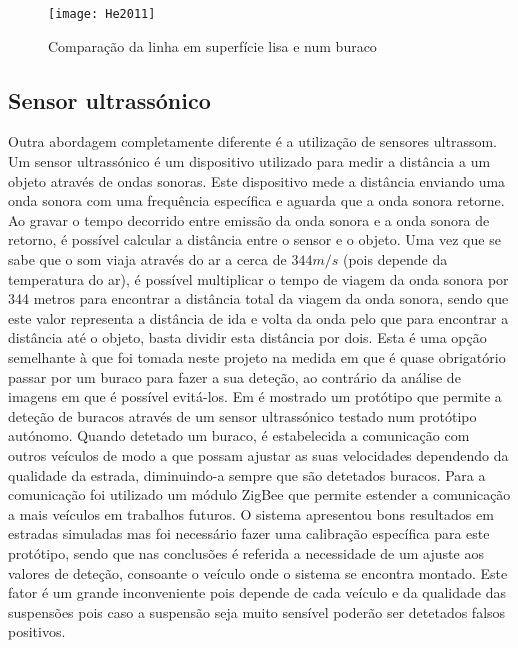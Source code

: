 \begin{figure}[htbp]
	\centering
	\texttt{[image: He2011]}
	\caption[Comparação da linha em superfície lisa e num buraco]{Comparação da linha em superfície lisa e num buraco \footnotemark}
	\label{fig:sensor_kinect}
\end{figure}
\vspace{5cm}

\subsection{Sensor ultrassónico}
\label{subsec:sensor_ultrassonico}
Outra abordagem completamente diferente é a utilização de sensores ultrassom.
Um sensor ultrassónico é um dispositivo utilizado para medir a distância a um objeto através de ondas sonoras.
Este dispositivo mede a distância enviando uma onda sonora com uma frequência específica e aguarda que a onda sonora retorne.
Ao gravar o tempo decorrido entre emissão da onda sonora e a onda sonora de retorno, é possível calcular a distância entre o sensor e o objeto.
Uma vez que se sabe que o som viaja através do ar a cerca de $344 m/s$ (pois depende da temperatura do ar), é possível multiplicar o tempo de viagem da onda sonora por 344 metros para encontrar a distância total da viagem da onda sonora, sendo que este valor representa a distância de ida e volta da onda pelo que para encontrar a distância até o objeto, basta dividir esta distância por dois.
Esta é uma opção semelhante à que foi tomada neste projeto na medida em que é quase obrigatório passar por um buraco para fazer a sua deteção, ao contrário da análise de imagens em que é possível evitá-los. 
Em \cite{Hegde2015} é mostrado um protótipo que permite a deteção de buracos através de um sensor ultrassónico testado num protótipo autónomo. Quando detetado um buraco, é estabelecida a comunicação com outros veículos de modo a que possam ajustar as suas velocidades dependendo da qualidade da estrada, diminuindo-a sempre que são detetados buracos.
Para a comunicação foi utilizado um módulo ZigBee que permite estender a comunicação a mais veículos em trabalhos futuros.
O sistema apresentou bons resultados em estradas simuladas mas foi necessário fazer uma calibração específica para este protótipo, sendo que nas conclusões é referida a necessidade de um ajuste aos valores de deteção, consoante o veículo onde o sistema se encontra montado.
Este fator é um grande inconveniente pois depende de cada veículo e da qualidade das suspensões pois caso a suspensão seja muito sensível poderão ser detetados falsos positivos.
